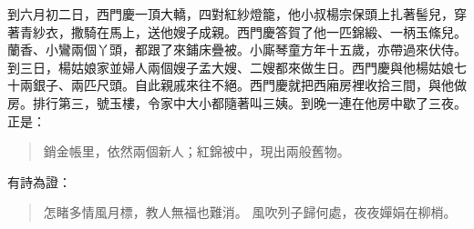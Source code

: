 到六月初二日，西門慶一頂大轎，四對紅紗燈籠，他小叔楊宗保頭上扎著髻兒，穿著青紗衣，撒騎在馬上，送他嫂子成親。西門慶答賀了他一匹錦緞、一柄玉絛兒。蘭香、小鸞兩個丫頭，都跟了來鋪床疊被。小廝琴童方年十五歲，亦帶過來伏侍。到三日，楊姑娘家並婦人兩個嫂子孟大嫂、二嫂都來做生日。西門慶與他楊姑娘七十兩銀子、兩匹尺頭。自此親戚來往不絕。西門慶就把西廂房裡收拾三間，與他做房。排行第三，號玉樓，令家中大小都隨著叫三姨。到晚一連在他房中歇了三夜。正是：
\begin{quote}
銷金帳里，依然兩個新人；紅錦被中，現出兩般舊物。
\end{quote}
有詩為證：
\begin{quote}
怎睹多情風月標，教人無福也難消。
風吹列子歸何處，夜夜嬋娟在柳梢。
\end{quote}
